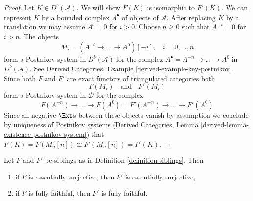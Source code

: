 \begin{proof}
Let $K \in D^b(\mathcal{A})$. We will show $F(K)$ is isomorphic to $F'(K)$.
We can represent $K$ by a bounded complex $A^\bullet$ of objects of
$\mathcal{A}$. After replacing $K$ by a translation we may
assume $A^i = 0$ for $i > 0$. Choose $n \geq 0$ such that $A^{-i} = 0$
for $i > n$. The objects
$$
M_i = (A^{-i} \to \ldots \to A^0)[-i],\quad i = 0, \ldots, n
$$
form a Postnikov system in $D^b(\mathcal{A})$ for the complex
$A^\bullet = A^{-n} \to \ldots \to A^0$ in $D^b(\mathcal{A})$.
See Derived Categories, Example \ref{derived-example-key-postnikov}.
Since both $F$ and $F'$ are exact functors of triangulated categories both
$$
F(M_i)
\quad\text{and}\quad
F'(M_i)
$$
form a Postnikov system in $\mathcal{D}$ for the complex
$$
F(A^{-n}) \to \ldots \to F(A^0) =
F'(A^{-n}) \to \ldots \to F'(A^0)
$$
Since all negative $\Ext$s between these objects vanish by assumption
we conclude by uniqueness of Postnikov systems
(Derived Categories, Lemma \ref{derived-lemma-existence-postnikov-system})
that $F(K) = F(M_n[n]) \cong F'(M_n[n]) = F'(K)$.
\end{proof}

\begin{lemma}
\label{lemma-sibling-faithful}
Let $F$ and $F'$ be siblings as in Definition \ref{definition-siblings}.
Then
\begin{enumerate}
\item if $F$ is essentially surjective, then $F'$ is essentially
surjective,
\item if $F$ is fully faithful, then $F'$ is fully faithful.
\end{enumerate}
\end{lemma}


